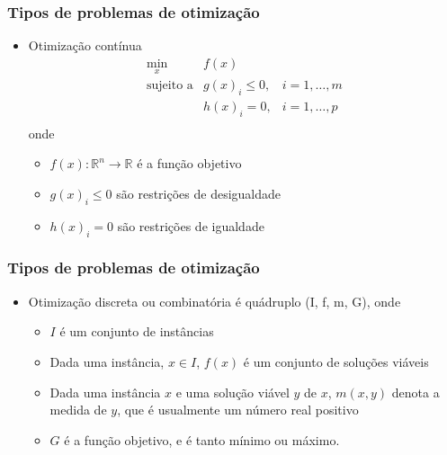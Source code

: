 \documentclass[xcolor=dvipsnames]{beamer}
\begin{document}
\begin{frame}%
\frametitle{Tipos de problemas de otimização}

\begin{itemize}
\item Otimização contínua
\[
\begin{array}{lll}
 \displaystyle\min_{x}          & f(x) & \\
 \mbox{sujeito a} & g(x)_{i} \leq 0, &  i = 1, \ldots, m \\
                  & h(x)_{i} = 0, &  i = 1, \ldots, p \\
\end{array}
\]
onde
\begin{itemize}
\item $f(x): \mathbb{R}^{n} \rightarrow \mathbb{R}$ é a função objetivo
\item $g(x)_{i} \leq 0 $ são restrições de desigualdade
\item $h(x)_{i} = 0 $ são restrições de igualdade
\end{itemize}



\end{itemize}

\end{frame}%


\begin{frame}%
\frametitle{Tipos de problemas de otimização}

\begin{itemize}
\item Otimização discreta ou combinatória é quádruplo (I, f, m, G), onde

\begin{itemize}
\vspace{10pt}\item $I$ é um conjunto de instâncias
\vspace{10pt}\item Dada uma instância, $x \in I$, $f(x)$ é um conjunto de soluções viáveis
\vspace{10pt}\item Dada uma instância $x$ e uma solução viável $y$ de $x$, $m(x,y)$ denota a medida de $y$, que é usualmente um número real positivo
\vspace{10pt}\item $G$ é a função objetivo, e é tanto mínimo ou máximo.
\end{itemize}

\end{itemize}

\end{frame}%
\end{document}
